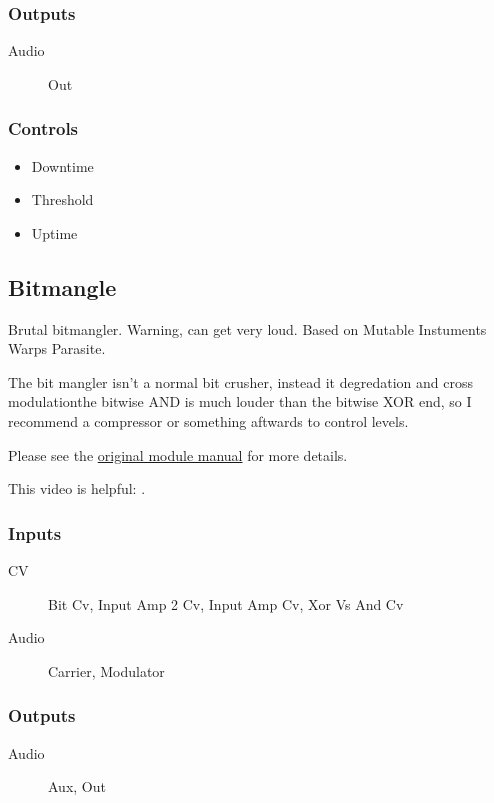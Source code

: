 \subsubsection{Outputs}
\begin{description}
\item [Audio] Out
\end{description}

\subsubsection{Controls}
\begin{itemize}
\item Downtime
\item Threshold
\item Uptime
\end{itemize}

\subsection{Bitmangle}

Brutal bitmangler. Warning, can get very loud. Based on Mutable Instuments Warps Parasite.

The bit mangler isn't a normal bit crusher, instead it degredation and cross modulationthe bitwise AND is much louder than the bitwise XOR end, so I recommend a compressor or something aftwards to control levels.

Please see the \href{https://mqtthiqs.github.io/parasites/warps.html}{original module manual} for more details.

This video is helpful: \url{}.

\subsubsection{Inputs}
\begin{description}
\item [CV] Bit Cv, Input Amp 2 Cv, Input Amp Cv, Xor Vs And Cv
\item [Audio] Carrier, Modulator
\end{description}

\subsubsection{Outputs}
\begin{description}
\item [Audio] Aux, Out
\end{description}

